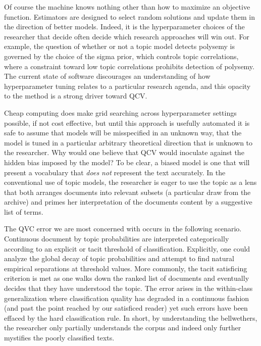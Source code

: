 \documentclass[]{book}
\theoremstyle{definition}
\theoremstyle{definition}
\theoremstyle{definition}
\theoremstyle{remark}
\begin{document}
Of course the machine knows nothing other than how to maximize an
objective function. Estimators are designed to select random solutions
and update them in the direction of better models. Indeed, it is the
hyperparameter choices of the researcher that decide often decide which
research approaches will win out. For example, the question of whether
or not a topic model detects polysemy is governed by the choice of the
sigma prior, which controls topic correlations, where a constraint
toward low topic correlations prohibits detection of polysemy. The
current state of software discourages an understanding of how
hyperparameter tuning relates to a particular research agenda, and this
opacity to the method is a strong driver toward QCV.

Cheap computing does make grid searching across hyperparameter settings
possible, if not cost effective, but until this approach is usefully
automated it is safe to assume that models will be misspecified in an
unknown way, that the model is tuned in a particular arbitrary
theoretical direction that is unknown to the researcher. Why would one
believe that QCV would inoculate against the hidden bias imposed by the
model? To be clear, a biased model is one that will present a vocabulary
that \emph{does not} represent the text accurately. In the conventional
use of topic models, the researcher is eager to use the topic as a lens
that both arranges documents into relevant subsets (a particular draw
from the archive) and primes her interpretation of the documents content
by a suggestive list of terms.

The QVC error we are most concerned with occurs in the following
scenario. Continuous document by topic probabilities are interpreted
categorically according to an explicit or tacit threshold of
classification. Explicitly, one could analyze the global decay of topic
probabilities and attempt to find natural empirical separations at
threshold values. More commonly, the tacit satisficing criterion is met
as one walks down the ranked list of documents and eventually decides
that they have understood the topic. The error arises in the
within-class generalization where classification quality has degraded in
a continuous fashion (and past the point reached by our satisficed
reader) yet such errors have been effaced by the hard classification
rule. In short, by understanding the bellwethers, the researcher only
partially understands the corpus and indeed only further mystifies the
poorly classified texts.
\end{document}
